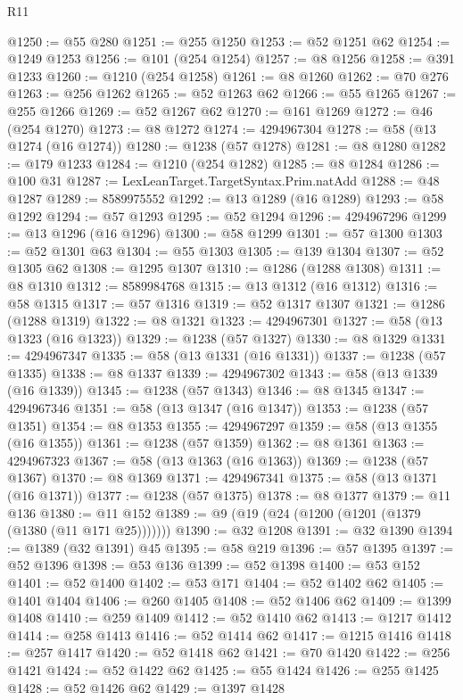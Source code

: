 \begin{lexlean}{R11}
\begin{coremodule}
@1250 := @55 @280
@1251 := @255 @1250
@1253 := @52 @1251 @62
@1254 := @1249 @1253
@1256 := @101 (@254 @1254)
@1257 := @8 @1256
@1258 := @391 @1233
@1260 := @1210 (@254 @1258)
@1261 := @8 @1260
@1262 := @70 @276
@1263 := @256 @1262
@1265 := @52 @1263 @62
@1266 := @55 @1265
@1267 := @255 @1266
@1269 := @52 @1267 @62
@1270 := @161 @1269
@1272 := @46 (@254 @1270)
@1273 := @8 @1272
@1274 := 4294967304
@1278 := @58 (@13 @1274 (@16 @1274))
@1280 := @1238 (@57 @1278)
@1281 := @8 @1280
@1282 := @179 @1233
@1284 := @1210 (@254 @1282)
@1285 := @8 @1284
@1286 := @100 @31
@1287 := LexLeanTarget.TargetSyntax.Prim.natAdd
@1288 := @48 @1287
@1289 := 8589975552
@1292 := @13 @1289 (@16 @1289)
@1293 := @58 @1292
@1294 := @57 @1293
@1295 := @52 @1294
@1296 := 4294967296
@1299 := @13 @1296 (@16 @1296)
@1300 := @58 @1299
@1301 := @57 @1300
@1303 := @52 @1301 @63
@1304 := @55 @1303
@1305 := @139 @1304
@1307 := @52 @1305 @62
@1308 := @1295 @1307
@1310 := @1286 (@1288 @1308)
@1311 := @8 @1310
@1312 := 8589984768
@1315 := @13 @1312 (@16 @1312)
@1316 := @58 @1315
@1317 := @57 @1316
@1319 := @52 @1317 @1307
@1321 := @1286 (@1288 @1319)
@1322 := @8 @1321
@1323 := 4294967301
@1327 := @58 (@13 @1323 (@16 @1323))
@1329 := @1238 (@57 @1327)
@1330 := @8 @1329
@1331 := 4294967347
@1335 := @58 (@13 @1331 (@16 @1331))
@1337 := @1238 (@57 @1335)
@1338 := @8 @1337
@1339 := 4294967302
@1343 := @58 (@13 @1339 (@16 @1339))
@1345 := @1238 (@57 @1343)
@1346 := @8 @1345
@1347 := 4294967346
@1351 := @58 (@13 @1347 (@16 @1347))
@1353 := @1238 (@57 @1351)
@1354 := @8 @1353
@1355 := 4294967297
@1359 := @58 (@13 @1355 (@16 @1355))
@1361 := @1238 (@57 @1359)
@1362 := @8 @1361
@1363 := 4294967323
@1367 := @58 (@13 @1363 (@16 @1363))
@1369 := @1238 (@57 @1367)
@1370 := @8 @1369
@1371 := 4294967341
@1375 := @58 (@13 @1371 (@16 @1371))
@1377 := @1238 (@57 @1375)
@1378 := @8 @1377
@1379 := @11 @136
@1380 := @11 @152
@1389 := @9 (@19 (@24 (@1200 (@1201 (@1379 (@1380 (@11 @171 @25)))))))
@1390 := @32 @1208
@1391 := @32 @1390
@1394 := @1389 (@32 @1391) @45
@1395 := @58 @219
@1396 := @57 @1395
@1397 := @52 @1396
@1398 := @53 @136
@1399 := @52 @1398
@1400 := @53 @152
@1401 := @52 @1400
@1402 := @53 @171
@1404 := @52 @1402 @62
@1405 := @1401 @1404
@1406 := @260 @1405
@1408 := @52 @1406 @62
@1409 := @1399 @1408
@1410 := @259 @1409
@1412 := @52 @1410 @62
@1413 := @1217 @1412
@1414 := @258 @1413
@1416 := @52 @1414 @62
@1417 := @1215 @1416
@1418 := @257 @1417
@1420 := @52 @1418 @62
@1421 := @70 @1420
@1422 := @256 @1421
@1424 := @52 @1422 @62
@1425 := @55 @1424
@1426 := @255 @1425
@1428 := @52 @1426 @62
@1429 := @1397 @1428

\end{coremodule}
\end{lexlean}
